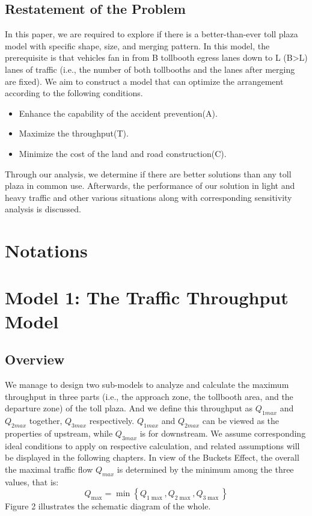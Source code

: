 \documentclass{mcmthesis}
\begin{document}
\subsection{Restatement of the Problem}
In this paper, we are required to explore if there is a
better-than-ever toll plaza model with specific shape,
size, and merging pattern. In this model, the prerequisite
is that vehicles fan in from B tollbooth egress lanes down
to L (B\textgreater L) lanes of traffic (i.e., the number of both
tollbooths and the lanes after merging are fixed). We aim
to construct a model that can optimize the arrangement
according to the following conditions.

\begin{itemize}
\item Enhance the capability of the accident prevention(A).
\item Maximize the throughput(T).
\item Minimize the cost of the land and road
construction(C).
\end{itemize}

Through our analysis, we determine if there are better
solutions than any toll plaza in common use. Afterwards,
the performance of our solution in light and heavy traffic
and other various situations along with corresponding
sensitivity analysis is discussed.


\section{Notations}

\section{Model 1: The Traffic Throughput Model}
\subsection{Overview}
We manage to design two sub-models to analyze and
calculate the maximum throughput in three parts
(i.e., the approach zone, the tollbooth area, and
the departure zone) of the toll plaza. And we define
this throughput as $Q_{1max}$ and $Q_{2max}$ together,
$Q_{3max}$ respectively. $Q_{1max}$ and $Q_{2max}$ can
be viewed as the properties of upstream, while $Q_{3max}$
 is for downstream. We assume corresponding ideal
 conditions to apply on respective calculation, and
 related assumptions will be displayed in the following
 chapters. In view of the Buckets Effect, the overall
 the maximal traffic flow $Q_{max}$ is determined by
 the minimum among the three values, that is:
\[{Q_{\max }} = \min \left\{ {{Q_{1\max }},{Q_{2\max }},{Q_{3\max }}} \right\}\]
Figure 2 illustrates the schematic diagram of the whole.
\end{document}
